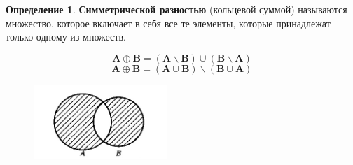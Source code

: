 \documentclass[12pt, a4paper, oneside]{article}
\theoremstyle{plain} %
\theoremstyle{definition}
\newtheorem*{definition}{Определение}  %
\newcommand{\indef}[1]{\textbf{ \color{dark_red} #1}}
\begin{document}
\begin{definition}

\indef{Симметрической разностью} (кольцевой суммой) называются множество, которое включает в себя все те элементы, которые принадлежат только одному из множеств.

\[\textbf{A} \oplus \textbf{B} = (\textbf{A} \backslash \textbf{B}) \cup (\textbf{B} \backslash \textbf{A})\]
\[\textbf{A} \oplus \textbf{B} =(\textbf{A} \cup \textbf{B}) \backslash (\textbf{B} \cup \textbf{A})\]

\end{definition}

\begin{figure}[h!]
    \centering
    \includegraphics[width=0.45\textwidth]{ped.jpg}
\end{figure}
\end{document}
